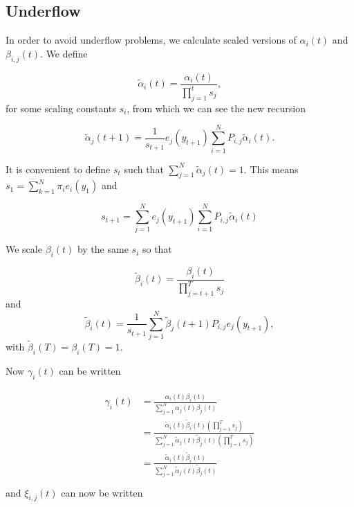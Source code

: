 \documentclass{article}
\begin{document}
\subsection{Underflow}
In order to avoid underflow problems, we calculate scaled versions of
$\alpha_i(t)$ and $\beta_{i,j}(t)$. We define 

\begin{equation}
    \tilde{\alpha}_i(t) = \frac{\alpha_i(t)}{\prod_{j=1}^t s_j},
\end{equation}
for some scaling constants $s_i$, from which we can see the new recursion

\begin{equation}
    \tilde{\alpha}_j(t+1) = \frac{1}{s_{t+1}}e_j(y_{t+1})
        \sum_{i=1}^NP_{i,j}\tilde{\alpha}_i(t).
\end{equation}

It is convenient to define $s_t$ such that 
$\sum_{j=1}^N \tilde{\alpha}_j(t) = 1$. This means 
$s_1 = \sum_{k=1}^N \pi_i e_i(y_1)$ and 

\begin{equation}
    s_{t+1} = \sum_{j=1}^Ne_j(y_{t+1})\sum_{i=1}^NP_{i,j}\tilde{\alpha}_i(t)
\end{equation}

We scale $\beta_i(t)$ by the same $s_i$ so that

\begin{equation}
    \tilde{\beta}_i(t) = \frac{\beta_i(t)}{\prod_{j=t+1}^T s_j}
\end{equation}
and
\begin{equation}
    \tilde{\beta}_i(t) = \frac{1}{s_{t+1}}\sum_{j=1}^N\tilde{\beta}_j(t+1)P_{i,j}e_j(y_{t+1}),
\end{equation}
with $\tilde{\beta}_i(T) = \beta_i(T) = 1$.

Now $\gamma_i(t)$ can be written

\begin{align}
    \begin{split}
        \gamma_i(t) &=
        \frac{\alpha_i(t)\beta_i(t)}{\sum_{j=1}^N\alpha_j(t)\beta_j(t)} \\
        &=
        \frac{\tilde{\alpha}_i(t)\tilde{\beta}_i(t)\left(\prod_{j=1}^Ts_j\right)}
        {\sum_{j=1}^N\tilde{\alpha}_j(t)\tilde{\beta}_j(t)\left(\prod_{j=1}^Ts_j\right)} \\
        &=
        \frac{\tilde{\alpha}_i(t)\tilde{\beta}_i(t)}
        {\sum_{j=1}^N\tilde{\alpha}_j(t)\tilde{\beta}_j(t)} \\
    \end{split}
\end{align}
and $\xi_{i,j}(t)$ can now be written
\end{document}
